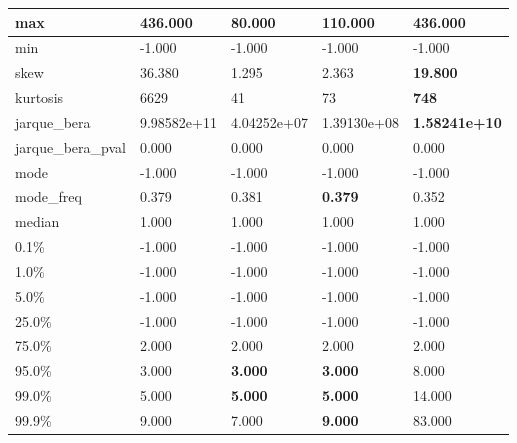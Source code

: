\begin{table}[H]
\begin{tabular}{|l|m{10em}|m{10em}|m{10em}|m{10em}|}
\hline max & 436.000 & \cellcolor[rgb]{0.9, 0.54, 0.52} 80.000 & 110.000 & \bfseries 436.000 \\
\hline min & -1.000 & -1.000 & -1.000 & -1.000 \\
\hline skew & 36.380 & \cellcolor[rgb]{0.9, 0.54, 0.52} 1.295 & 2.363 & \bfseries 19.800 \\
\hline kurtosis & 6629 & \cellcolor[rgb]{0.9, 0.54, 0.52} 41 & 73 & \bfseries 748 \\
\hline jarque\_bera & 9.98582e+11 & \cellcolor[rgb]{0.9, 0.54, 0.52} 4.04252e+07 & 1.39130e+08 & \bfseries 1.58241e+10 \\
\hline jarque\_bera\_pval & 0.000 & 0.000 & 0.000 & 0.000 \\
\hline mode & -1.000 & -1.000 & -1.000 & -1.000 \\
\hline mode\_freq & 0.379 & 0.381 & \bfseries 0.379 & \cellcolor[rgb]{0.9, 0.54, 0.52} 0.352 \\
\hline median & 1.000 & 1.000 & 1.000 & 1.000 \\
\hline 0.1\% & -1.000 & -1.000 & -1.000 & -1.000 \\
\hline 1.0\% & -1.000 & -1.000 & -1.000 & -1.000 \\
\hline 5.0\% & -1.000 & -1.000 & -1.000 & -1.000 \\
\hline 25.0\% & -1.000 & -1.000 & -1.000 & -1.000 \\
\hline 75.0\% & 2.000 & 2.000 & 2.000 & 2.000 \\
\hline 95.0\% & 3.000 & \bfseries 3.000 & \bfseries 3.000 & \cellcolor[rgb]{0.9, 0.54, 0.52} 8.000 \\
\hline 99.0\% & 5.000 & \bfseries 5.000 & \bfseries 5.000 & \cellcolor[rgb]{0.9, 0.54, 0.52} 14.000 \\
\hline 99.9\% & 9.000 & 7.000 & \bfseries 9.000 & \cellcolor[rgb]{0.9, 0.54, 0.52} 83.000 \\
\hline
\end{tabular}
\end{table}
